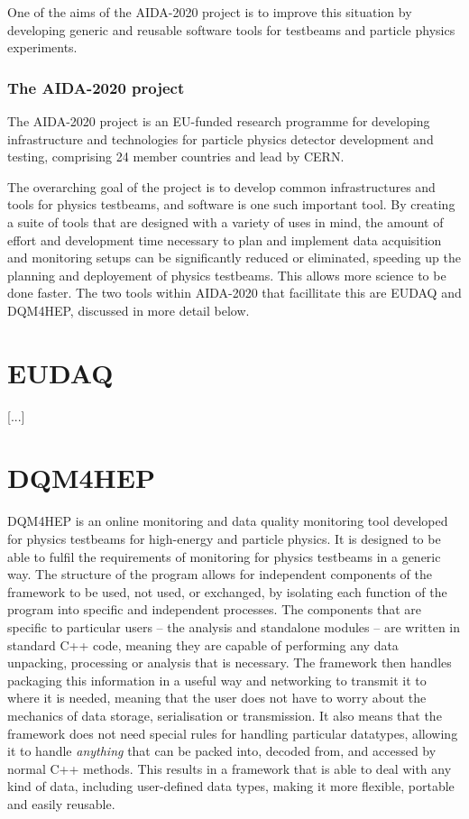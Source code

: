 One of the aims of the AIDA-2020 project is to improve this situation by developing generic and reusable software tools for testbeams and particle physics experiments.

\subsubsection{The AIDA-2020 project}
The AIDA-2020 project is an EU-funded research programme for developing infrastructure and technologies for particle physics detector development and testing, comprising 24 member countries and lead by CERN.

The overarching goal of the project is to develop common infrastructures and tools for physics testbeams, and software is one such important tool. By creating a suite of tools that are designed with a variety of uses in mind, the amount of effort and development time necessary to plan and implement data acquisition and monitoring setups can be significantly reduced or eliminated, speeding up the planning and deployement of physics testbeams. This allows more science to be done faster. The two tools within AIDA-2020 that facillitate this are EUDAQ and DQM4HEP, discussed in more detail below.

\section{EUDAQ}
[...]

\section{DQM4HEP}
DQM4HEP is an online monitoring and data quality monitoring tool developed for physics testbeams for high-energy and particle physics. It is designed to be able to fulfil the requirements of monitoring for physics testbeams in a generic way. The structure of the program allows for independent components of the framework to be used, not used, or exchanged, by isolating each function of the program into specific and independent processes. The components that are specific to particular users -- the analysis and standalone modules -- are written in standard C++ code, meaning they are capable of performing any data unpacking, processing or analysis that is necessary. The framework then handles packaging this information in a useful way and networking to transmit it to where it is needed, meaning that the user does not have to worry about the mechanics of data storage, serialisation or transmission. It also means that the framework does not need special rules for handling particular datatypes, allowing it to handle \emph{anything} that can be packed into, decoded from, and accessed by normal C++ methods. This results in a framework that is able to deal with any kind of data, including user-defined data types, making it more flexible, portable and easily reusable.

